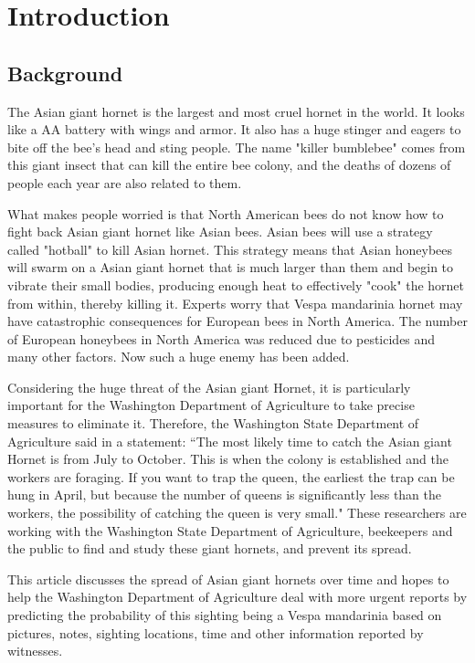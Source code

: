 \documentclass{mcmthesis}
\numberwithin{figure}{section}
\numberwithin{table}{section}
\begin{document}
\newpage

\pagestyle{fancy}

\setcounter{page}{1}
\section{Introduction}
\subsection{Background}

The Asian giant hornet is the largest and most cruel hornet in the world. It looks like a AA battery with wings and armor. It also has a huge stinger and eagers to bite off the bee’s head and sting people. The name "killer bumblebee" comes from this giant insect that can kill the entire bee colony, and the deaths of dozens of people each year are also related to them.

What makes people worried is that North American bees do not know how to fight back Asian giant hornet like Asian bees. Asian bees will use a strategy called "hotball" to kill Asian hornet. This strategy means that Asian honeybees will swarm on a Asian giant hornet that is much larger than them and begin to vibrate their small bodies, producing enough heat to effectively "cook" the hornet from within, thereby killing it. Experts worry that Vespa mandarinia hornet may have catastrophic consequences for European bees in North America. The number of European honeybees in North America was reduced due to pesticides and many other factors. Now such a huge enemy has been added.

Considering the huge threat of the Asian giant Hornet, it is particularly important for the Washington Department of Agriculture to take precise measures to eliminate it. Therefore, the Washington State Department of Agriculture said in a statement: “The most likely time to catch the Asian giant Hornet is from July to October. This is when the colony is established and the workers are foraging. If you want to trap the queen, the earliest the trap can be hung in April, but because the number of queens is significantly less than the workers, the possibility of catching the queen is very small." These researchers are working with the Washington State Department of Agriculture, beekeepers and the public to find and study these giant hornets, and prevent its spread.

This article discusses the spread of Asian giant hornets over time and hopes to help the Washington Department of Agriculture deal with more urgent reports by predicting the probability of this sighting being a Vespa mandarinia based on pictures, notes, sighting locations, time and other information reported by witnesses.
\end{document}
